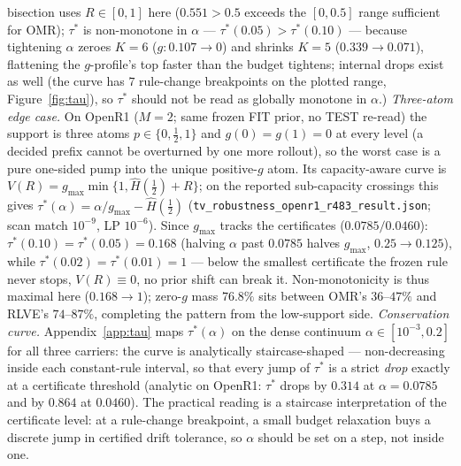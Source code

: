 \documentclass{article}
\theoremstyle{definition}
\theoremstyle{remark}
\begin{document}
bisection uses $R\in[0,1]$ here ($0.551>0.5$ exceeds the $[0,0.5]$ range
sufficient for OMR); $\tau^*$ is non-monotone in $\alpha$ ---
$\tau^*(0.05)>\tau^*(0.10)$ --- because tightening $\alpha$ zeroes $K{=}6$
($g:0.107\!\to\!0$) and shrinks $K{=}5$ ($0.339\!\to\!0.071$), flattening
the $g$-profile's top faster than the budget tightens; internal drops
exist as well (the curve has $7$ rule-change breakpoints on the plotted
range, Figure~\ref{fig:tau}), so $\tau^*$ should not be read as globally
monotone in $\alpha$.)
\emph{Three-atom edge case.} On OpenR1 ($M{=}2$; same frozen FIT prior, no
TEST re-read) the support is three atoms $p\in\{0,\tfrac12,1\}$ and
$g(0)=g(1)=0$ at every level (a decided prefix cannot be overturned by one
more rollout), so the worst case is a pure one-sided pump into the unique
positive-$g$ atom. Its capacity-aware curve is
$V(R)=g_{\max}\min\{1,\widehat H(\tfrac12)+R\}$; on the reported
sub-capacity crossings this gives
$\tau^*(\alpha)=\alpha/g_{\max}-\widehat H(\tfrac12)$
(\texttt{tv\_robustness\_openr1\_r483\_result.json}; scan match $10^{-9}$,
LP $10^{-6}$). Since $g_{\max}$ tracks the certificates ($0.0785/0.0460$):
$\tau^*(0.10)=\tau^*(0.05)=0.168$ (halving $\alpha$ past $0.0785$ halves
$g_{\max}$, $0.25\!\to\!0.125$), while $\tau^*(0.02)=\tau^*(0.01)=1$ ---
below the smallest certificate the frozen rule never stops, $V(R)\equiv0$,
no prior shift can break it. Non-monotonicity is thus maximal here
($0.168\!\to\!1$); zero-$g$ mass $76.8\%$ sits between OMR's $36$--$47\%$
and RLVE's $74$--$87\%$, completing the pattern from the low-support side.
\emph{Conservation curve.} Appendix~\ref{app:tau} maps
$\tau^*(\alpha)$ on the dense continuum $\alpha\in[10^{-3},0.2]$ for all
three carriers: the curve is analytically staircase-shaped ---
non-decreasing inside each constant-rule interval, so that every jump of
$\tau^*$ is a strict \emph{drop} exactly at a certificate threshold
(analytic on OpenR1: $\tau^*$ drops by $0.314$ at $\alpha=0.0785$ and by
$0.864$ at $0.0460$). The practical reading is a
staircase interpretation of the certificate level: at a rule-change
breakpoint, a small budget relaxation buys a discrete jump in certified
drift tolerance, so $\alpha$ should be set on a step, not inside one.
\end{document}
